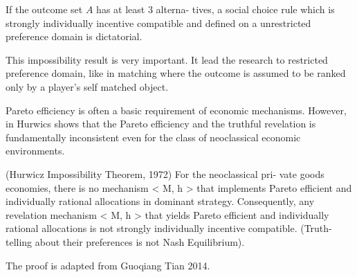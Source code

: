 \begin{thm}
If the outcome set $A$ has at least 3 alterna-
tives, a social choice rule which is strongly individually incentive compatible and
defined on a unrestricted preference domain is dictatorial.
\end{thm}

This impossibility result is very important. It lead the research to restricted preference domain, like in matching where the outcome is assumed to be ranked only by a player's self matched object. 

Pareto efficiency is often a basic requirement of economic
mechanisms. However, in \parencite{Hurwicz1972}
Hurwics  shows that  the Pareto efficiency and the truthful revelation is
fundamentally inconsistent even for the class of neoclassical economic
environments.
\begin{thm}
(Hurwicz Impossibility Theorem, 1972) For the neoclassical pri-
vate goods economies, there is no mechanism < M, h > that implements Pareto efficient
and individually rational allocations in dominant strategy. Consequently, any revelation
mechanism < M, h > that yields Pareto efficient and individually rational allocations is
not strongly individually incentive compatible. (Truth-telling about their preferences is not
Nash Equilibrium).
\end{thm}
The proof is adapted from Guoqiang Tian 2014.
